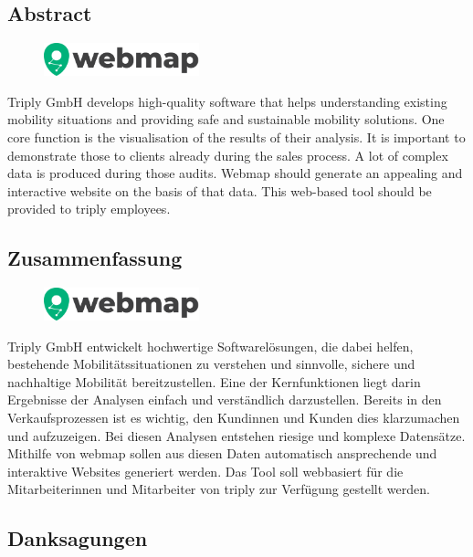 \begin{spacing}{1}
    \chapter*{Abstract}
\end{spacing}
\begin{figure}
    \begin{center}
      \includegraphics[width=0.4\textwidth]{pics/webmap_logo}
    \end{center}
\end{figure}
Triply GmbH develops high-quality software that helps understanding existing mobility situations and providing safe and sustainable mobility solutions.
One core function is the visualisation of the results of their analysis.
It is important to demonstrate those to clients already during the sales process.
A lot of complex data is produced during those audits.
Webmap should generate an appealing and interactive website on the basis of that data.
This web-based tool should be provided to triply employees.
\newpage
\begin{spacing}{1}
    \chapter*{Zusammenfassung}
\end{spacing}
\begin{figure}
    \begin{center}
      \includegraphics[width=0.4\textwidth]{pics/webmap_logo}
    \end{center}
\end{figure}
Triply GmbH entwickelt hochwertige Softwarelösungen, die dabei helfen,
bestehende Mobilitätssituationen zu verstehen und sinnvolle, sichere und
nachhaltige Mobilität bereitzustellen.
Eine der Kernfunktionen liegt darin Ergebnisse der Analysen einfach und verständlich darzustellen.
Bereits in den Verkaufsprozessen ist es wichtig, den Kundinnen und Kunden dies klarzumachen und aufzuzeigen.
Bei diesen Analysen entstehen riesige und komplexe Datensätze.
Mithilfe von webmap sollen aus diesen Daten automatisch ansprechende und interaktive Websites generiert werden.
Das Tool soll webbasiert für die Mitarbeiterinnen und Mitarbeiter von triply zur Verfügung gestellt werden.

\newpage
\begin{spacing}{1}
    \chapter{Danksagungen}
\end{spacing}
